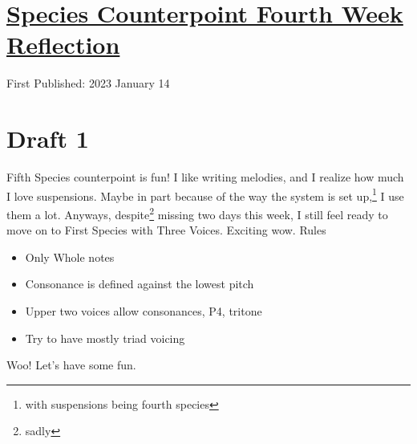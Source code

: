 \documentclass[12pt]{article}[titlepage]
\newcommand{\1}{\={a}}
\newcommand{\2}{\={e}}
\newcommand{\3}{\={\i}}
\newcommand{\4}{\=o}
\newcommand{\5}{\=u}
\newcommand{\6}{\={A}}
\renewcommand{\,}{\textsuperscript{,}}
\begin{document}
\doublespacing
\section{\href{species-counterpoint-week-4.html}{Species Counterpoint Fourth Week Reflection}}
First Published: 2023 January 14
\section{Draft 1}
Fifth Species counterpoint is fun!
I like writing melodies, and I realize how much I love suspensions.
Maybe in part because of the way the system is set up,\footnote{with suspensions being fourth species} I use them a lot.
Anyways, despite\footnote{sadly} missing two days this week, I still feel ready to move on to First Species with Three Voices.
Exciting wow.
Rules
\begin{itemize}
\item Only Whole notes
\item Consonance is defined against the lowest pitch
\item Upper two voices allow consonances, P4, tritone
\item Try to have mostly triad voicing
\end{itemize}
Woo! Let's have some fun.
\end{document}
